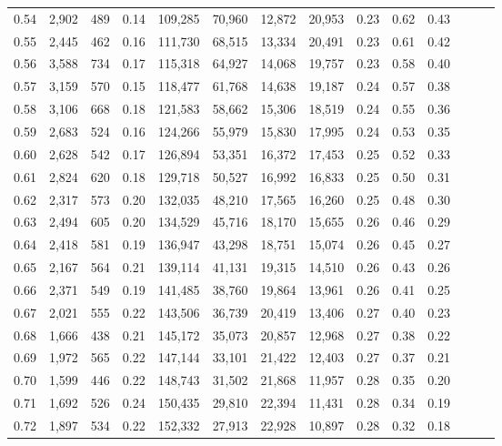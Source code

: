 \begin{tabular}{rrrrrrrrrrrrrr}
0.54 &  2,902 &  489 &  0.14 &  109,285 &   70,960 &  12,872 &  20,953 &  0.23 &  0.62 &      0.43 \\
0.55 &  2,445 &  462 &  0.16 &  111,730 &   68,515 &  13,334 &  20,491 &  0.23 &  0.61 &      0.42 \\
0.56 &  3,588 &  734 &  0.17 &  115,318 &   64,927 &  14,068 &  19,757 &  0.23 &  0.58 &      0.40 \\
0.57 &  3,159 &  570 &  0.15 &  118,477 &   61,768 &  14,638 &  19,187 &  0.24 &  0.57 &      0.38 \\
0.58 &  3,106 &  668 &  0.18 &  121,583 &   58,662 &  15,306 &  18,519 &  0.24 &  0.55 &      0.36 \\
0.59 &  2,683 &  524 &  0.16 &  124,266 &   55,979 &  15,830 &  17,995 &  0.24 &  0.53 &      0.35 \\
0.60 &  2,628 &  542 &  0.17 &  126,894 &   53,351 &  16,372 &  17,453 &  0.25 &  0.52 &      0.33 \\
0.61 &  2,824 &  620 &  0.18 &  129,718 &   50,527 &  16,992 &  16,833 &  0.25 &  0.50 &      0.31 \\
0.62 &  2,317 &  573 &  0.20 &  132,035 &   48,210 &  17,565 &  16,260 &  0.25 &  0.48 &      0.30 \\
0.63 &  2,494 &  605 &  0.20 &  134,529 &   45,716 &  18,170 &  15,655 &  0.26 &  0.46 &      0.29 \\
0.64 &  2,418 &  581 &  0.19 &  136,947 &   43,298 &  18,751 &  15,074 &  0.26 &  0.45 &      0.27 \\
0.65 &  2,167 &  564 &  0.21 &  139,114 &   41,131 &  19,315 &  14,510 &  0.26 &  0.43 &      0.26 \\
0.66 &  2,371 &  549 &  0.19 &  141,485 &   38,760 &  19,864 &  13,961 &  0.26 &  0.41 &      0.25 \\
0.67 &  2,021 &  555 &  0.22 &  143,506 &   36,739 &  20,419 &  13,406 &  0.27 &  0.40 &      0.23 \\
0.68 &  1,666 &  438 &  0.21 &  145,172 &   35,073 &  20,857 &  12,968 &  0.27 &  0.38 &      0.22 \\
0.69 &  1,972 &  565 &  0.22 &  147,144 &   33,101 &  21,422 &  12,403 &  0.27 &  0.37 &      0.21 \\
0.70 &  1,599 &  446 &  0.22 &  148,743 &   31,502 &  21,868 &  11,957 &  0.28 &  0.35 &      0.20 \\
0.71 &  1,692 &  526 &  0.24 &  150,435 &   29,810 &  22,394 &  11,431 &  0.28 &  0.34 &      0.19 \\
0.72 &  1,897 &  534 &  0.22 &  152,332 &   27,913 &  22,928 &  10,897 &  0.28 &  0.32 &      0.18 \\

\end{tabular}

